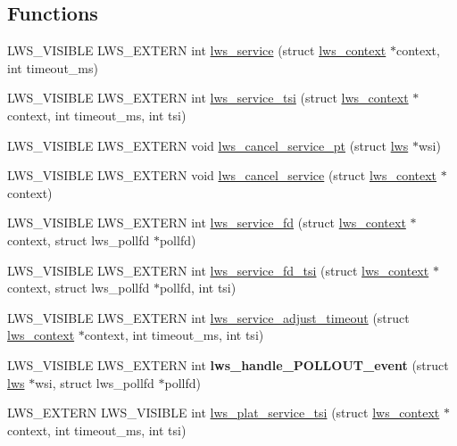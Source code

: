 \subsection*{Functions}
\begin{DoxyCompactItemize}
\item 
L\+W\+S\+\_\+\+V\+I\+S\+I\+B\+LE L\+W\+S\+\_\+\+E\+X\+T\+E\+RN int \hyperlink{group__service_gaf95bd0c663d6516a0c80047d9b1167a8}{lws\+\_\+service} (struct \hyperlink{structlws__context}{lws\+\_\+context} $\ast$context, int timeout\+\_\+ms)
\item 
L\+W\+S\+\_\+\+V\+I\+S\+I\+B\+LE L\+W\+S\+\_\+\+E\+X\+T\+E\+RN int \hyperlink{group__service_ga9b3cc4473fd8848e5bbee7f310712939}{lws\+\_\+service\+\_\+tsi} (struct \hyperlink{structlws__context}{lws\+\_\+context} $\ast$context, int timeout\+\_\+ms, int tsi)
\item 
L\+W\+S\+\_\+\+V\+I\+S\+I\+B\+LE L\+W\+S\+\_\+\+E\+X\+T\+E\+RN void \hyperlink{group__service_ga29c246707997ab7a466aa709aecd2d7b}{lws\+\_\+cancel\+\_\+service\+\_\+pt} (struct \hyperlink{structlws}{lws} $\ast$wsi)
\item 
L\+W\+S\+\_\+\+V\+I\+S\+I\+B\+LE L\+W\+S\+\_\+\+E\+X\+T\+E\+RN void \hyperlink{group__service_ga53e3d0801dfda7960a7249dd559e68a2}{lws\+\_\+cancel\+\_\+service} (struct \hyperlink{structlws__context}{lws\+\_\+context} $\ast$context)
\item 
L\+W\+S\+\_\+\+V\+I\+S\+I\+B\+LE L\+W\+S\+\_\+\+E\+X\+T\+E\+RN int \hyperlink{group__service_gad82efa5466d14a9f05aa06416375b28d}{lws\+\_\+service\+\_\+fd} (struct \hyperlink{structlws__context}{lws\+\_\+context} $\ast$context, struct lws\+\_\+pollfd $\ast$pollfd)
\item 
L\+W\+S\+\_\+\+V\+I\+S\+I\+B\+LE L\+W\+S\+\_\+\+E\+X\+T\+E\+RN int \hyperlink{group__service_gaebf426eda371ba23642fc11d8e0ace6b}{lws\+\_\+service\+\_\+fd\+\_\+tsi} (struct \hyperlink{structlws__context}{lws\+\_\+context} $\ast$context, struct lws\+\_\+pollfd $\ast$pollfd, int tsi)
\item 
L\+W\+S\+\_\+\+V\+I\+S\+I\+B\+LE L\+W\+S\+\_\+\+E\+X\+T\+E\+RN int \hyperlink{group__service_ga4fd9d714434ca499e2b3f7dbba86f241}{lws\+\_\+service\+\_\+adjust\+\_\+timeout} (struct \hyperlink{structlws__context}{lws\+\_\+context} $\ast$context, int timeout\+\_\+ms, int tsi)
\item 
\mbox{\label{group__service_ga14937ff6dd3e2b0104c2fe60c0a41e46}} 
L\+W\+S\+\_\+\+V\+I\+S\+I\+B\+LE L\+W\+S\+\_\+\+E\+X\+T\+E\+RN int {\bfseries lws\+\_\+handle\+\_\+\+P\+O\+L\+L\+O\+U\+T\+\_\+event} (struct \hyperlink{structlws}{lws} $\ast$wsi, struct lws\+\_\+pollfd $\ast$pollfd)
\item 
L\+W\+S\+\_\+\+E\+X\+T\+E\+RN L\+W\+S\+\_\+\+V\+I\+S\+I\+B\+LE int \hyperlink{group__service_gab1ff2c19455268fa0d5b617d8057fbfc}{lws\+\_\+plat\+\_\+service\+\_\+tsi} (struct \hyperlink{structlws__context}{lws\+\_\+context} $\ast$context, int timeout\+\_\+ms, int tsi)
\end{DoxyCompactItemize}


